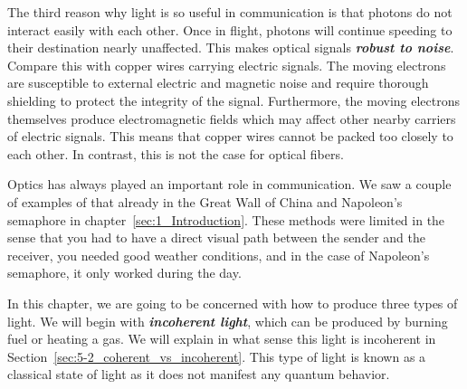 The third reason why light is so useful in communication is that photons do not interact easily with each other.
Once in flight, photons will continue speeding to their destination nearly unaffected.
This makes optical signals \textit{\textbf{robust to noise}}.
Compare this with copper wires carrying electric signals.
The moving electrons are susceptible to external electric and magnetic noise and require thorough shielding to protect the integrity of the signal.
Furthermore, the moving electrons themselves produce electromagnetic fields which may affect other nearby carriers of electric signals.
This means that copper wires cannot be packed too closely to each other.
In contrast, this is not the case for optical fibers.


Optics has always played an important role in communication.
We saw a couple of examples of that already in the Great Wall of China and Napoleon's semaphore in chapter~\ref{sec:1_Introduction}.
These methods were limited in the sense that you had to have a direct visual path between the sender and the receiver, you needed good weather conditions, and in the case of Napoleon's semaphore, it only worked during the day.

In this chapter, we are going to be concerned with how to produce three types of light.
We will begin with \textit{\textbf{incoherent light}}, which can be produced by burning fuel or heating a gas.
We will explain in what sense this light is incoherent in Section~\ref{sec:5-2_coherent_vs_incoherent}.
This type of light is known as a classical state of light as it does not manifest any quantum behavior.

